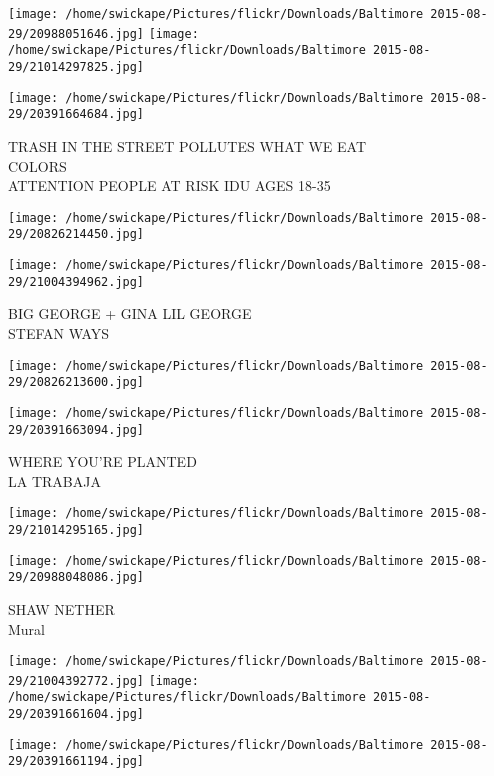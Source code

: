 \documentclass[10pt,letterpaper]{article}
\begin{document}
\texttt{[image: /home/swickape/Pictures/flickr/Downloads/Baltimore 2015-08-29/20988051646.jpg]}
\texttt{[image: /home/swickape/Pictures/flickr/Downloads/Baltimore 2015-08-29/21014297825.jpg]}

\texttt{[image: /home/swickape/Pictures/flickr/Downloads/Baltimore 2015-08-29/20391664684.jpg]}

TRASH IN THE STREET POLLUTES WHAT WE EAT\\
COLORS\\
ATTENTION PEOPLE AT RISK IDU AGES 18{-}35\\
\pagebreak

\texttt{[image: /home/swickape/Pictures/flickr/Downloads/Baltimore 2015-08-29/20826214450.jpg]}

\vspace{0.25in}
\texttt{[image: /home/swickape/Pictures/flickr/Downloads/Baltimore 2015-08-29/21004394962.jpg]}

BIG GEORGE + GINA LIL GEORGE\\
STEFAN WAYS\\
\pagebreak

\texttt{[image: /home/swickape/Pictures/flickr/Downloads/Baltimore 2015-08-29/20826213600.jpg]}

\vspace{0.25in}
\texttt{[image: /home/swickape/Pictures/flickr/Downloads/Baltimore 2015-08-29/20391663094.jpg]}

WHERE YOU'RE PLANTED\\
LA TRABAJA\\
\pagebreak

\texttt{[image: /home/swickape/Pictures/flickr/Downloads/Baltimore 2015-08-29/21014295165.jpg]}

\vspace{0.25in}
\texttt{[image: /home/swickape/Pictures/flickr/Downloads/Baltimore 2015-08-29/20988048086.jpg]}

SHAW NETHER\\
Mural\\
\pagebreak

\texttt{[image: /home/swickape/Pictures/flickr/Downloads/Baltimore 2015-08-29/21004392772.jpg]}
\texttt{[image: /home/swickape/Pictures/flickr/Downloads/Baltimore 2015-08-29/20391661604.jpg]}

\texttt{[image: /home/swickape/Pictures/flickr/Downloads/Baltimore 2015-08-29/20391661194.jpg]}
\end{document}
